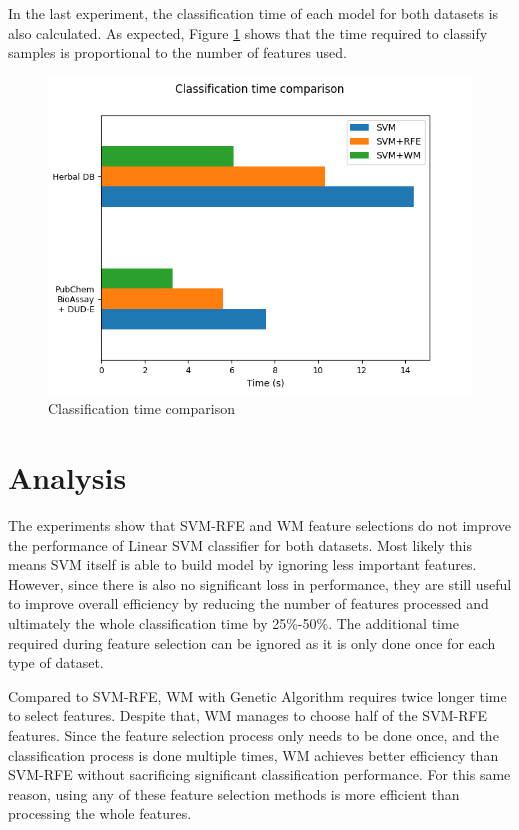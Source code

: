 \documentclass[conference]{IEEEtran}
\begin{document}
In the last experiment, the classification time of each model for both datasets is also calculated. As expected, Figure \ref{fig_classification_time_comparison} shows that the time required to classify samples is proportional to the number of features used.

\begin{figure}
	\centering	
	\includegraphics[scale=0.4]{../images/classification_time_comparison.png}
	\caption{Classification time comparison}
	\label{fig_classification_time_comparison}
\end{figure}

\section{Analysis}

The experiments show that SVM-RFE and WM feature selections do not improve the performance of Linear SVM classifier for both datasets. Most likely this means SVM itself is able to build model by ignoring less important features. However, since there is also no significant loss in performance, they are still useful to improve overall efficiency by reducing the number of features processed and ultimately the whole classification time by 25\%-50\%. The additional time required during feature selection can be ignored as it is only done once for each type of dataset.

Compared to SVM-RFE, WM with Genetic Algorithm requires twice longer time to select features. Despite that, WM manages to choose half of the SVM-RFE features. Since the feature selection process only needs to be done once, and the classification process is done multiple times, WM achieves better efficiency than SVM-RFE without sacrificing significant classification performance. For this same reason, using any of these feature selection methods is more efficient than processing the whole features.
\end{document}
